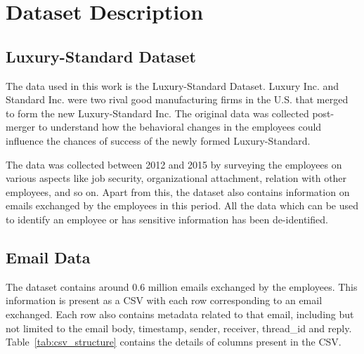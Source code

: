 
\chapter{Dataset Description} %

\label{Chapter3} %



\section{Luxury-Standard Dataset}

The data used in this work is the Luxury-Standard Dataset\cite{Sung2017EmployeesRT}. Luxury Inc. and Standard Inc. were two rival good manufacturing firms in the U.S. that merged to form the new Luxury-Standard Inc. The original data was collected post-merger to understand how the behavioral changes in the employees could influence the chances of success of the newly formed Luxury-Standard.

The data was collected between 2012 and 2015 by surveying the employees on various aspects like job security, organizational attachment, relation with other employees, and so on. Apart from this, the dataset also contains information on emails exchanged by the employees in this period. All the data which can be used to identify an employee or has sensitive information has been de-identified. \\



\section{Email Data}

The dataset contains around 0.6 million emails exchanged by the employees. This information is present as a CSV with each row corresponding to an email exchanged. Each row also contains metadata related to that email, including but not limited to the email body, timestamp, sender, receiver, thread\_id and reply. Table~\ref{tab:csv_structure} contains the details of columns present in the CSV. \\


